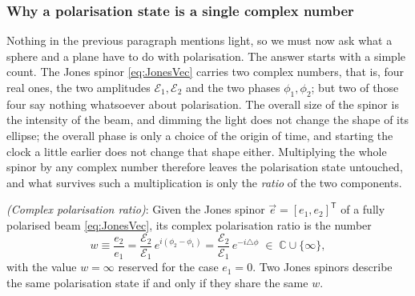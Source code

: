         \subsubsection{Why a polarisation state is a single complex number}

            Nothing in the previous paragraph mentions light, so we must now ask what a sphere and a plane have to do with polarisation. The answer starts with a simple count. The Jones spinor \ref{eq:JonesVec} carries two complex numbers, that is, four real ones, the two amplitudes $\mathcal{E}_1,\mathcal{E}_2$ and the two phases $\phi_1,\phi_2$; but two of those four say nothing whatsoever about polarisation. The overall size of the spinor is the intensity of the beam, and dimming the light does not change the shape of its ellipse; the overall phase is only a choice of the origin of time, and starting the clock a little earlier does not change that shape either. Multiplying the whole spinor by any complex number therefore leaves the polarisation state untouched, and what survives such a multiplication is only the \textit{ratio} of the two components.

            \begin{myDef}
                \textit{(Complex polarisation ratio)}: Given the Jones spinor $\vec{e}=[e_1,e_2]^{\mathsf{T}}$ of a fully polarised beam \ref{eq:JonesVec}, its complex polarisation ratio is the number
                \begin{equation}\label{eq:ComplexRatio}
                    w \equiv \frac{e_2}{e_1} = \frac{\mathcal{E}_2}{\mathcal{E}_1}\,e^{i\left(\phi_2-\phi_1\right)} = \frac{\mathcal{E}_2}{\mathcal{E}_1}\,e^{-i\triangle\phi} \;\in\; \mathbb{C}\cup\{\infty\},
                \end{equation}
                with the value $w=\infty$ reserved for the case $e_1=0$. Two Jones spinors describe the same polarisation state if and only if they share the same $w$.
            \end{myDef}

